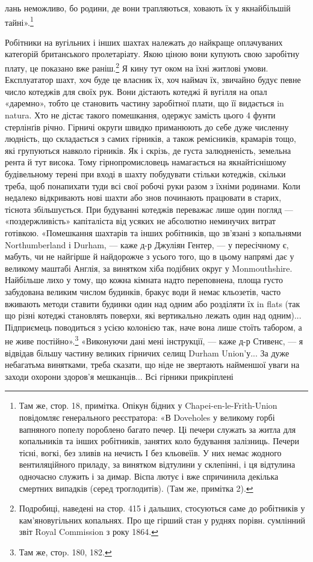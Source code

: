 лань неможливо, бо родини, де вони трапляються, ховають їх
у якнайбільшій тайні».\footnote{
Там же, стор. 18, примітка. Опікун бідних у Chapei-en-le-Frith-Union
повідомляє генерального реєстратора: «В Doveholes у великому
горбі вапняного попелу пороблено багато печер. Ці печери служать
за житла для копальників та інших робітників, занятих коло будування
залізниць. Печери тісні, вогкі, без зливів на нечисть І без кльовеїів.
У них немає жодного вентиляційного приладу, за винятком відтулини у
склепінні, і ця відтулина одночасно служить і за димар. Віспа лютує і
вже спричинила декілька смертних випадків (серед троглодитів). (Там же,
примітка 2).
}

Робітники на вугільних і інших шахтах належать до найкраще
оплачуваних категорій британського пролетаріату. Якою ціною
вони купують свою заробітну плату, це показано вже раніш.\footnote{
Подробиці, наведені на стор. 415 і дальших, стосуються саме до
робітників у кам'яновугільних копальнях. Про ще гірший стан у руднях
порівн. сумлінний звіт Royal Commission з року 1864.
}
Я кину тут оком на їхні житлові умови. Експлуататор шахт,
хоч буде це власник їх, хоч наймач їх, звичайно будує певне
число котеджів для своїх рук. Вони дістають котеджі й вугілля
на опал «даремно», тобто це становить частину заробітної плати,
що її видається in natura. Хто не дістає такого помешкання,
одержує замість цього 4 фунти стерлінґів річно. Гірничі округи
швидко приманюють до себе дуже численну людність, що складається
з самих гірників, а також ремісників, крамарів тощо,
які групуються навколо гірників. Як і скрізь, де густа залюдненість,
земельна рента й тут висока. Тому гірнопромисловець
намагається на якнайтіснішому будівельному терені при вході
в шахту побудувати стільки котеджів, скільки треба, щоб понапихати
туди всі свої робочі руки разом з їхніми родинами.
Коли недалеко відкривають нові шахти або знов починають
працювати в старих, тіснота збільшується. При будуванні котеджів
переважає лише один погляд — «поздержливість» капіталіста
від усяких не абсолютно неминучих витрат готівкою.
«Помешкання шахтарів та інших робітників, що зв’язані з копальнями
Northumberland і Durham, — каже д-р Джуліян Гентер,
— у пересічному є, мабуть, чи не найгірше й найдорожче
з усього того, що в цьому напрямі дає у великому маштабі
Англія, за винятком хіба подібних округ у Monmouthshire. Найбільше
лихо у тому, що кожна кімната надто переповнена, площа
густо забудована великим числом будинків, бракує води й
немає кльозетів, часто вживають методи ставити будинки один
над одним або розділяти їх in flats (так що різні котеджі становлять
поверхи, які вертикально лежать один над одним)... Підприємець
поводиться з усією колонією так, наче вона лише стоїть
табором, а не живе постійно».\footnote{
Там же, стоp. 180, 182.
} «Виконуючи дані мені інструкції,
— каже д-р Стивенс, — я відвідав більшу частину великих
гірничих селищ Durham Union’у... За дуже небагатьма винятками,
треба сказати, що ніде не звертають найменшої уваги на
заходи охорони здоров’я мешканців... Всі гірники прикріплені
